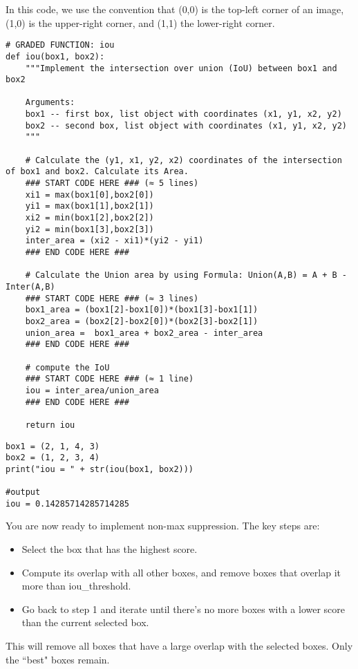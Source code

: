 In this code, we use the convention that (0,0) is the top-left corner of an image, (1,0) is the upper-right corner, and (1,1) the lower-right corner.
\begin{verbatim}
# GRADED FUNCTION: iou
def iou(box1, box2):
    """Implement the intersection over union (IoU) between box1 and box2
    
    Arguments:
    box1 -- first box, list object with coordinates (x1, y1, x2, y2)
    box2 -- second box, list object with coordinates (x1, y1, x2, y2)
    """

    # Calculate the (y1, x1, y2, x2) coordinates of the intersection of box1 and box2. Calculate its Area.
    ### START CODE HERE ### (≈ 5 lines)
    xi1 = max(box1[0],box2[0])
    yi1 = max(box1[1],box2[1])
    xi2 = min(box1[2],box2[2])
    yi2 = min(box1[3],box2[3])
    inter_area = (xi2 - xi1)*(yi2 - yi1)
    ### END CODE HERE ###    

    # Calculate the Union area by using Formula: Union(A,B) = A + B - Inter(A,B)
    ### START CODE HERE ### (≈ 3 lines)
    box1_area = (box1[2]-box1[0])*(box1[3]-box1[1])
    box2_area = (box2[2]-box2[0])*(box2[3]-box2[1])
    union_area =  box1_area + box2_area - inter_area
    ### END CODE HERE ###
    
    # compute the IoU
    ### START CODE HERE ### (≈ 1 line)
    iou = inter_area/union_area 
    ### END CODE HERE ###

    return iou
\end{verbatim}
\begin{verbatim}
box1 = (2, 1, 4, 3)
box2 = (1, 2, 3, 4) 
print("iou = " + str(iou(box1, box2)))

#output
iou = 0.14285714285714285
\end{verbatim}


You are now ready to implement non-max suppression. The key steps are:
\begin{itemize}
\item Select the box that has the highest score.
\item Compute its overlap with all other boxes, and remove boxes that overlap it more than iou\_threshold.
\item Go back to step 1 and iterate until there's no more boxes with a lower score than the current selected box.
\end{itemize}

This will remove all boxes that have a large overlap with the selected boxes. Only the ``best" boxes remain.

